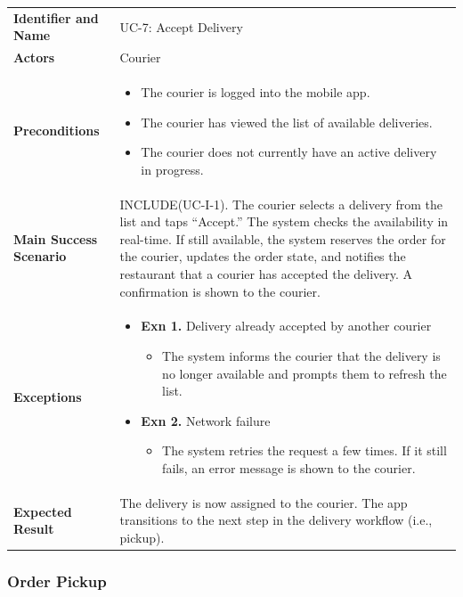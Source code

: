 \noindent
\begin{tabularx}{\textwidth}{l X}
    \textbf{Identifier and Name} & UC-7: Accept Delivery \\
    \textbf{Actors} & Courier \\
    \textbf{Preconditions} & 
    \begin{itemize} 
        \item The courier is logged into the mobile app.
        \item The courier has viewed the list of available deliveries.
        \item The courier does not currently have an active delivery in progress.
    \end{itemize} \\
    \textbf{Main Success Scenario} & INCLUDE(UC-I-1). The courier selects a delivery from the list and taps “Accept.” The system checks the availability in real-time. If still available, the system reserves the order for the courier, updates the order state, and notifies the restaurant that a courier has accepted the delivery. A confirmation is shown to the courier. \\
    \textbf{Exceptions} & 
    \begin{itemize} 
        \item \textbf{Exn 1.} Delivery already accepted by another courier
        \begin{itemize}
            \item The system informs the courier that the delivery is no longer available and prompts them to refresh the list.
        \end{itemize}
        \item \textbf{Exn 2.} Network failure
        \begin{itemize}
            \item The system retries the request a few times. If it still fails, an error message is shown to the courier.
        \end{itemize}
    \end{itemize} \\
    \textbf{Expected Result} & The delivery is now assigned to the courier. The app transitions to the next step in the delivery workflow (i.e., pickup).
\end{tabularx}


\subsubsection{Order Pickup}

